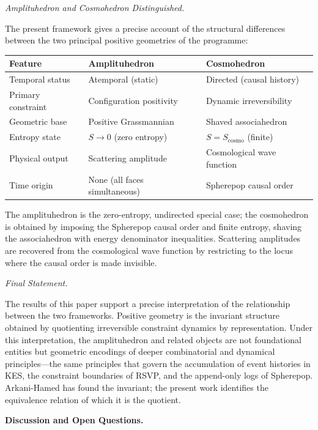 \documentclass[11pt]{article}
\theoremstyle{plain}
\theoremstyle{definition}
\theoremstyle{remark}
\newcommand{\Sf}{S}
\begin{document}
\medskip\noindent\textit{Amplituhedron and Cosmohedron Distinguished.}

The present framework gives a precise account of the structural differences between the two principal positive geometries of the programme:

\begin{center}
\begin{tabular}{lll}
\toprule
Feature & Amplituhedron & Cosmohedron \\
\midrule
Temporal status & Atemporal (static) & Directed (causal history) \\
Primary constraint & Configuration positivity & Dynamic irreversibility \\
Geometric base & Positive Grassmannian & Shaved associahedron \\
Entropy state & $\Sf \to 0$ (zero entropy) & $\Sf = \Sf_{\mathrm{cosmo}}$ (finite) \\
Physical output & Scattering amplitude & Cosmological wave function \\
Time origin & None (all faces simultaneous) & Spherepop causal order \\
\bottomrule
\end{tabular}
\end{center}

The amplituhedron is the zero-entropy, undirected special case; the cosmohedron is obtained by imposing the Spherepop causal order and finite entropy, shaving the associahedron with energy denominator inequalities. Scattering amplitudes are recovered from the cosmological wave function by restricting to the locus where the causal order is made invisible.

\medskip\noindent\textit{Final Statement.}

The results of this paper support a precise interpretation of the relationship between the two frameworks. Positive geometry is the invariant structure obtained by quotienting irreversible constraint dynamics by representation. Under this interpretation, the amplituhedron and related objects are not foundational entities but geometric encodings of deeper combinatorial and dynamical principles---the same principles that govern the accumulation of event histories in KES, the constraint boundaries of RSVP, and the append-only logs of Spherepop. Arkani-Hamed has found the invariant; the present work identifies the equivalence relation of which it is the quotient.

\bigskip\noindent\textbf{Discussion and Open Questions.}
\label{sec:discussion}
\end{document}
